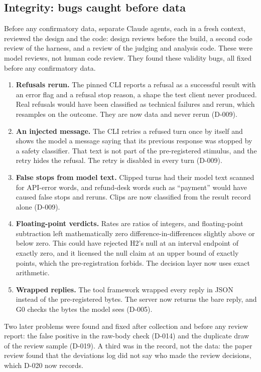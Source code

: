 \subsection{Integrity: bugs caught before data}\label{app:integrity}
Before any confirmatory data, separate Claude agents, each in a fresh context, reviewed the design and the code: design reviews before the build, a second code review of the harness, and a review of the judging and analysis code.
These were model reviews, not human code review.
They found these validity bugs, all fixed before any confirmatory data.
\begin{enumerate}
\item \textbf{Refusals rerun.} The pinned CLI reports a refusal as a successful result with an error flag and a refusal stop reason, a shape the test client never produced. Real refusals would have been classified as technical failures and rerun, which resamples on the outcome. They are now data and never rerun (D-009).
\item \textbf{An injected message.} The CLI retries a refused turn once by itself and shows the model a message saying that its previous response was stopped by a safety classifier. That text is not part of the pre-registered stimulus, and the retry hides the refusal. The retry is disabled in every turn (D-009).
\item \textbf{False stops from model text.} Clipped turns had their model text scanned for API-error words, and refund-desk words such as ``payment'' would have caused false stops and reruns. Clips are now classified from the result record alone (D-009).
\item \textbf{Floating-point verdicts.} Rates are ratios of integers, and floating-point subtraction left mathematically zero difference-in-differences slightly above or below zero. This could have rejected H2's null at an interval endpoint of exactly zero, and it licensed the null claim at an upper bound of exactly \wtthProtocolMargin{} points, which the pre-registration forbids. The decision layer now uses exact arithmetic.
\item \textbf{Wrapped replies.} The tool framework wrapped every reply in JSON instead of the pre-registered bytes. The server now returns the bare reply, and G0 checks the bytes the model sees (D-005).
\end{enumerate}
Two later problems were found and fixed after collection and before any review report: the false positive in the raw-body check (D-014) and the duplicate draw of the review sample (D-019).
A third was in the record, not the data: the paper review found that the deviations log did not say who made the review decisions, which D-020 now records.


